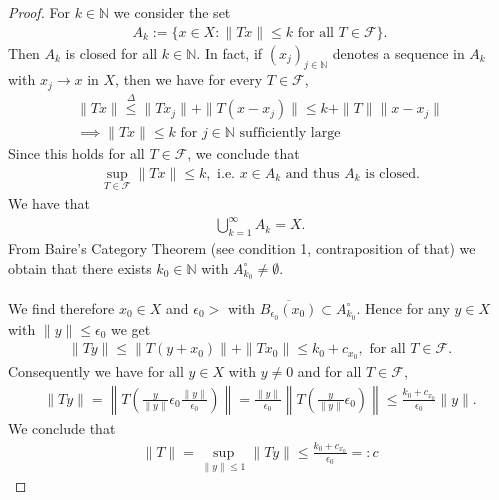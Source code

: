 \documentclass[11pt,a4paper]{article}
\theoremstyle{definition}
\begin{document}
\begin{proof}
For $k \in \mathbb{N}$ we consider the set 
\begin{align*}
A_k := \lbrace x \in X : \| Tx \| \leq k \text{ for all } T \in \mathcal{F} \rbrace.
\end{align*}
Then $A_k$ is closed for all $k \in \mathbb{N}$. In fact, if $(x_j)_{j \in \mathbb{N}}$ denotes a sequence in $A_k$ with $x_j \to x$ in $X$, then we have for every $T \in \mathcal{F}$,
\begin{align*}
\|Tx\| \overset{\Delta} \leq \| Tx_j\| + \|T(x-x_j)\| \leq k + \|T\| \|x-x_j\|   \\
\implies \|Tx\| \leq k \text{ for $j \in \mathbb{N}$ sufficiently large}
\end{align*}
Since this holds for all $T \in \mathcal{F}$, we conclude that 
\begin{align*}
\sup_{T \in \mathcal{F}} \|Tx \| \leq k, \text{ i.e. } x \in A_k \text{ and thus } A_k \text{ is closed}. 
\end{align*}
We have that 
\begin{align*}
\bigcup_{k=1}^\infty A_k = X.
\end{align*}
From Baire's Category Theorem (see condition 1, contraposition of that) we obtain that there exists $k_0 \in \mathbb{N}$ with $A_{k_0}^\circ \neq \emptyset$.
\\\\
 We find therefore $x_0 \in X$ and $\epsilon_0 >$ with $\overline{B_{ \epsilon_0}(x_0)} \subset A_{k_0}^\circ$. Hence for any $y \in X$ with $\| y \| \leq \epsilon_0$ we get 
\begin{align*}
\|Ty\| \leq \| T(y+x_0)\| + \|Tx_0\| \leq k_0 + c_{x_0}, \text{ for all } T \in \mathcal{F}.
\end{align*}
Consequently we have for all $y \in X$ with $y \neq 0$ and for all $T \in \mathcal{F}$,
\begin{align*}
\|Ty \| = \left\| T \left( \frac{y}{\|y\|} \epsilon_0 \frac{\|y \|}{\epsilon_0} \right) \right\| = \frac{\|y\|}{\epsilon_0} \left\| T \left( \frac{y}{\|y\|} 	\epsilon_0 \right) \right\| \leq \frac{k_0 + c_{x_0}}{\epsilon_0} \|y\|.
\end{align*}
We conclude that
\begin{align*}
\|T\| = \sup_{\|y\| \leq 1} \|Ty\| \leq \frac{k_0+c_{x_0}}{\epsilon_0}=:c
\end{align*}
\end{proof}
\end{document}
